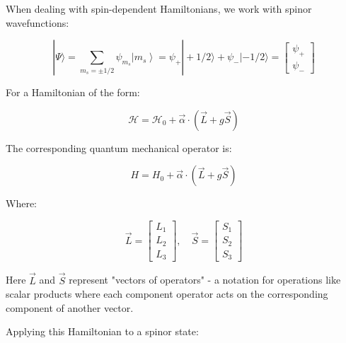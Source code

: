 \documentclass[italian]{HKNdocument}
\begin{document}
When dealing with spin-dependent Hamiltonians, we work with spinor wavefunctions:

\[
|\Psi\rangle=\sum_{m_{s}= \pm 1/2} \psi_{m_{s}}\left|m_{s}\right\rangle=\psi_{+}|+1/2\rangle+\psi_{-}|-1/2\rangle=\left[\begin{array}{l}
\psi_{+}  \label{eq:11.20}\\
\psi_{-}
\end{array}\right]
\]

For a Hamiltonian of the form:

\begin{equation}
\mathcal{H}=\mathcal{H}_{0}+\vec{\alpha} \cdot(\vec{L}+g \vec{S}) \label{eq:11.21}
\end{equation}

The corresponding quantum mechanical operator is:

\begin{equation}
H=H_{0}+\vec{\alpha} \cdot(\vec{L}+g \vec{S}) \label{eq:11.22}
\end{equation}

Where:

\[
\vec{L}=\left[\begin{array}{l}
L_{1}  \label{eq:11.23}\\
L_{2} \\
L_{3}
\end{array}\right], \quad \vec{S}=\left[\begin{array}{l}
S_{1} \\
S_{2} \\
S_{3}
\end{array}\right]
\]

Here $\vec{L}$ and $\vec{S}$ represent "vectors of operators" - a notation for operations like scalar products where each component operator acts on the corresponding component of another vector.

Applying this Hamiltonian to a spinor state:
\end{document}
